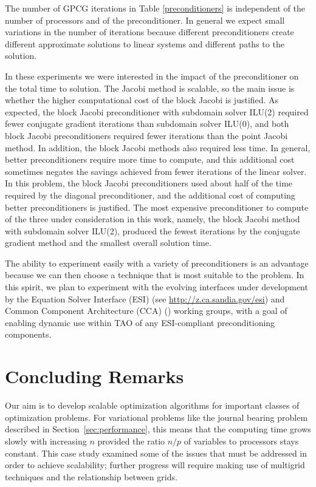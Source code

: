 \documentclass{esub2acm}
\begin{document}
The number of GPCG iterations in Table \ref{preconditioners}
is independent of the number of
processors and of the preconditioner. 
In general we expect small variations in the number of iterations 
because different preconditioners create different approximate solutions
to linear systems and different paths to the solution.

In these experiments we were interested in the impact of
the preconditioner on the total time to solution. The Jacobi method is
scalable, so the main issue is whether the higher computational
cost of the block Jacobi is justified.
As expected, the block Jacobi preconditioner with subdomain solver ILU(2)
required fewer conjugate gradient iterations than subdomain solver ILU(0),
and both block Jacobi preconditioners required fewer
iterations than the point Jacobi method.
In addition, the block Jacobi methods also required less time.
In general, better preconditioners require more time to compute, and
this additional cost sometimes negates the savings achieved from fewer
iterations of the linear solver. 
In this problem, 
the block Jacobi preconditioners used
about half of  the time required by the diagonal preconditioner, and
the additional cost of computing better preconditioners is justified.
The most expensive preconditioner to compute of the three under consideration
in this work, namely, the block Jacobi method with subdomain solver ILU(2),
produced the fewest iterations by
the conjugate gradient method and the smallest overall solution time.

The ability to experiment easily with a variety of preconditioners is
an advantage because we can then choose a technique that is most
suitable to the problem.  In this spirit, we plan to experiment with
the evolving interfaces under development by the Equation Solver
Interface (ESI) (see \url{http://z.ca.sandia.gov/esi}) and
Common Component Architecture
(CCA) () working groups, with a goal of
enabling dynamic use within TAO of any ESI-compliant preconditioning
components.

\section{Concluding Remarks}

Our aim is to develop scalable optimization algorithms
for important classes of optimization problems.
For variational problems like the journal bearing problem
described in Section~\ref{sec:performance}, this means that
the computing time grows slowly with increasing $n$
provided the ratio $ n/p $ of variables to processors stays constant.
This case study examined some of the issues that must be
addressed in order to achieve scalability;
further progress will require making use of multigrid
techniques and the relationship between grids.
\end{document}
